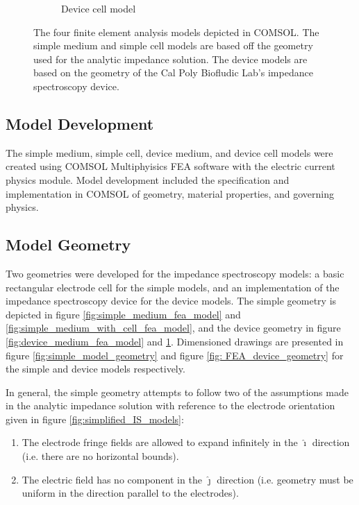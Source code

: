 \begin{figure}[h]
\begin{subfigure}[b]{0.45\textwidth}
        \caption{Device cell model}
        \label{fig:device_cell_fea_model}
    \end{subfigure}
    \caption[FEA models]{The four finite element analysis models depicted in COMSOL. The simple medium and simple cell models are based off the geometry used for the analytic impedance solution. The device models are based on the geometry of the Cal Poly Biofludic Lab's impedance spectroscopy device.}
    \label{fig:FEA_models}
\end{figure}


\subsection{Model Development}
\par The simple medium, simple cell, device medium, and device cell models were created using COMSOL Multiphyisics FEA software with the electric current physics module. Model development included the specification and implementation in COMSOL of geometry, material properties, and governing physics.

\subsection*{Model Geometry}
\par Two geometries were developed for the impedance spectroscopy models: a basic rectangular electrode cell for the simple models, and an implementation of the impedance spectroscopy device for the device models. The simple geometry is depicted in figure \ref{fig:simple_medium_fea_model} and \ref{fig:simple_medium_with_cell_fea_model}, and the device geometry in figure \ref{fig:device_medium_fea_model} and \ref{fig:device_cell_fea_model}. Dimensioned drawings are presented in figure \ref{fig:simple_model_geometry} and figure \ref{fig: FEA_device_geometry} for the simple and device models respectively.

\par In general, the simple geometry attempts to follow two of the assumptions made in the analytic impedance solution with reference to the electrode orientation given in figure \ref{fig:simplified_IS_models}:
\begin{enumerate}
    \item The electrode fringe fields are allowed to expand infinitely in the $\hat{\boldsymbol\imath}$ direction (i.e. there are no horizontal bounds).
    \item The electric field has no component in the $\hat{\boldsymbol\jmath}$ direction (i.e. geometry must be uniform in the direction parallel to the electrodes).
\end{enumerate}

